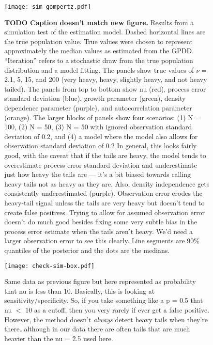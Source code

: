 \documentclass[10pt]{article}
\begin{document}
\clearpage

\begin{figure}[htbp]
\begin{center}
\texttt{[image: sim-gompertz.pdf]}
\caption{\textbf{TODO Caption doesn't match new figure.} Results from a simulation test of the estimation model. Dashed horizontal lines are the true population value. True values were chosen to represent approximately the median values as estimated from the GPDD. ``Iteration'' refers to a stochastic draw from the true population distribution and a model fitting. The panels show true values of $\nu = $ 2.1, 5, 15, and 200 (very heavy, heavy, slightly heavy, and not heavy tailed). The panels from top to bottom show nu (red), process error standard deviation (blue), growth parameter (green), density dependence parameter (purple), and autocorrelation parameter (orange). The larger blocks of panels show four scenarios: (1) N = 100, (2) N = 50, (3) N = 50 with ignored observation standard deviation of 0.2, and (4) a model where the model also allows for observation standard deviation of 0.2
In general, this looks fairly good, with the caveat that if the tails are heavy, the model tends to overestimate process error standard deviation and underestimate just how heavy the tails are --- it's a bit biased towards calling heavy tails not as heavy as they are. Also, density independence gets consistently underestimated (purple). Observation error erodes the heavy-tail signal unless the tails are very heavy but doesn't tend to create false positives. Trying to allow for assumed observation error doesn't do much good besides fixing some very subtle bias in the process error estimate when the tails aren't heavy. We'd need a larger observation error to see this clearly. Line segments are 90\% quantiles of the posterior and the dots are the medians.}
\label{default}
\end{center}
\end{figure}

\begin{figure}[htbp]
\begin{center}
\texttt{[image: check-sim-box.pdf]}
\caption{Same data as previous figure but here represented as probability that nu is less than 10. Basically, this is looking at sensitivity/specificity. So, if you take something like a p = 0.5 that nu $<$ 10 as a cutoff, then you very rarely if ever get a false positive. However, the method doesn't \textit{always} detect heavy tails when they're there\ldots although in our data there are often tails that are much heavier than the nu = 2.5 used here.}
\label{default}
\end{center}
\end{figure}



%

\end{document}
